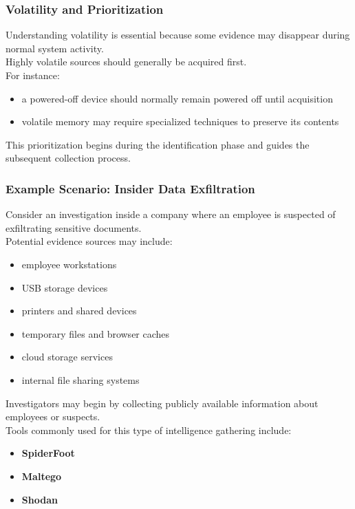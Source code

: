 \subsubsection{Volatility and Prioritization}

Understanding volatility is essential because some evidence may disappear during normal system activity.
\\
Highly volatile sources should generally be acquired first.
\\
For instance:

\begin{itemize}
\item a powered-off device should normally remain powered off until acquisition
\item volatile memory may require specialized techniques to preserve its contents
\end{itemize}

\noindent
This prioritization begins during the identification phase and guides the subsequent collection process.

\subsubsection*{Example Scenario: Insider Data Exfiltration}

Consider an investigation inside a company where an employee is suspected of exfiltrating sensitive documents.\\
Potential evidence sources may include:

\begin{itemize}
\item employee workstations
\item USB storage devices
\item printers and shared devices
\item temporary files and browser caches
\item cloud storage services
\item internal file sharing systems
\end{itemize}

\noindent
Investigators may begin by collecting publicly available information about employees or suspects.\\  
Tools commonly used for this type of intelligence gathering include:

\begin{itemize}
\item \textbf{SpiderFoot}
\item \textbf{Maltego}
\item \textbf{Shodan}
\end{itemize}

